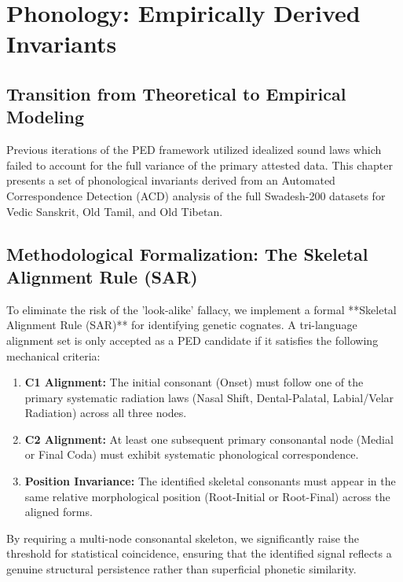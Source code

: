 \chapter{Phonology: Empirically Derived Invariants}

\section{Transition from Theoretical to Empirical Modeling}
Previous iterations of the PED framework utilized idealized sound laws which failed to account for the full variance of the primary attested data. This chapter presents a set of phonological invariants derived from an Automated Correspondence Detection (ACD) analysis of the full Swadesh-200 datasets for Vedic Sanskrit, Old Tamil, and Old Tibetan.

\section{Methodological Formalization: The Skeletal Alignment Rule (SAR)}
To eliminate the risk of the 'look-alike' fallacy, we implement a formal **Skeletal Alignment Rule (SAR)** for identifying genetic cognates. A tri-language alignment set is only accepted as a PED candidate if it satisfies the following mechanical criteria:

\begin{enumerate}
    \item \textbf{C1 Alignment:} The initial consonant (Onset) must follow one of the primary systematic radiation laws (Nasal Shift, Dental-Palatal, Labial/Velar Radiation) across all three nodes.
    \item \textbf{C2 Alignment:} At least one subsequent primary consonantal node (Medial or Final Coda) must exhibit systematic phonological correspondence.
    \item \textbf{Position Invariance:} The identified skeletal consonants must appear in the same relative morphological position (Root-Initial or Root-Final) across the aligned forms.
\end{enumerate}

By requiring a multi-node consonantal skeleton, we significantly raise the threshold for statistical coincidence, ensuring that the identified signal reflects a genuine structural persistence rather than superficial phonetic similarity.

